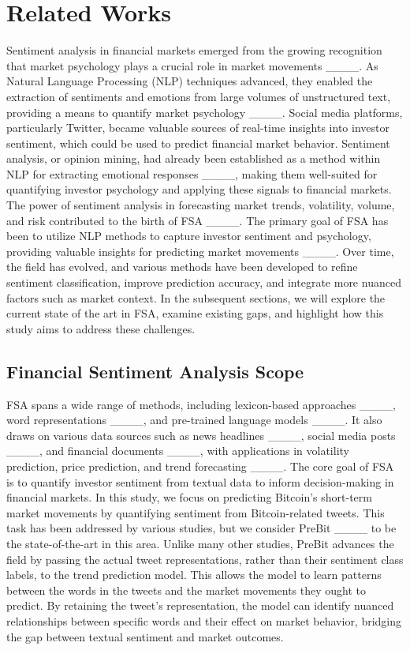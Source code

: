 \section{Related Works}
\label{sec:related_works}
Sentiment analysis in financial markets emerged from the growing recognition that market psychology plays a crucial role in market movements ____. As Natural Language Processing (NLP) techniques advanced, they enabled the extraction of sentiments and emotions from large volumes of unstructured text, providing a means to quantify market psychology ____. Social media platforms, particularly Twitter, became valuable sources of real-time insights into investor sentiment, which could be used to predict financial market behavior. Sentiment analysis, or opinion mining, had already been established as a method within NLP for extracting emotional responses ____, making them well-suited for quantifying investor psychology and applying these signals to financial markets. The power of sentiment analysis in forecasting market trends, volatility, volume, and risk contributed to the birth of FSA ____. The primary goal of FSA has been to utilize NLP methods to capture investor sentiment and psychology, providing valuable insights for predicting market movements ____. Over time, the field has evolved, and various methods have been developed to refine sentiment classification, improve prediction accuracy, and integrate more nuanced factors such as market context. In the subsequent sections, we will explore the current state of the art in FSA, examine existing gaps, and highlight how this study aims to address these challenges.

\subsection{Financial Sentiment Analysis Scope}
FSA spans a wide range of methods, including lexicon-based approaches ____, word representations ____, and pre-trained language models ____. It also draws on various data sources such as news headlines ____, social media posts ____, and financial documents ____, with applications in volatility prediction, price prediction, and trend forecasting ____. The core goal of FSA is to quantify investor sentiment from textual data to inform decision-making in financial markets. In this study, we focus on predicting Bitcoin’s short-term market movements by quantifying sentiment from Bitcoin-related tweets. This task has been addressed by various studies, but we consider PreBit ____ to be the state-of-the-art in this area. Unlike many other studies, PreBit advances the field by passing the actual tweet representations, rather than their sentiment class labels, to the trend prediction model. This allows the model to learn patterns between the words in the tweets and the market movements they ought to predict. By retaining the tweet’s representation, the model can identify nuanced relationships between specific words and their effect on market behavior, bridging the gap between textual sentiment and market outcomes.

